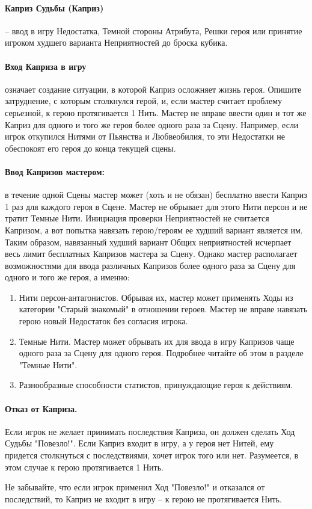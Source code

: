 \paragraph{Каприз Судьбы (Каприз)} – ввод в игру Недостатка, Темной стороны Атрибута, Решки героя или принятие игроком худшего варианта Неприятностей до броска кубика. 
\paragraph{Вход Каприза в игру} означает создание ситуации, в которой Каприз осложняет жизнь героя. Опишите затруднение, с которым столкнулся герой, и, если мастер считает проблему серьезной, к герою протягивается 1 Нить. 
\newline Мастер не вправе ввести один и тот же Каприз для одного и того же героя более одного раза за Сцену. Например, если игрок откупился Нитями от Пьянства и Любвеобилия, то эти Недостатки не обеспокоят его героя до конца текущей сцены.

\paragraph{Ввод Капризов мастером:} в течение одной Сцены мастер может (хоть и не обязан) бесплатно ввести Каприз 1 раз для каждого героя в Сцене. Мастер не обрывает для этого Нити персон и не тратит Темные Нити.
\newline Инициация проверки Неприятностей не считается Капризом, а вот попытка навязать герою/героям ее худший вариант является им. Таким образом, навязанный худший вариант Общих неприятностей исчерпает весь лимит бесплатных Капризов мастера за Сцену.
\newline Однако мастер располагает возможностями для ввода различных Капризов более одного раза за Сцену для одного и того же героя, а именно: 
\begin{enumerate}
    \item Нити персон-антагонистов. Обрывая их, мастер может применять Ходы из категории "Старый знакомый" в отношении героев. Мастер не вправе навязать герою новый Недостаток без согласия игрока.
    \item Темные Нити. Мастер может обрывать их для ввода в игру Капризов чаще одного раза за Сцену для одного героя. Подробнее читайте об этом в разделе "Темные Нити".
    \item Разнообразные способности статистов, принуждающие героя к действиям.
\end{enumerate}
\paragraph{Отказ от Каприза.} Если игрок не желает принимать последствия Каприза, он должен сделать Ход Судьбы "Повезло!". Если Каприз входит в игру, а у героя нет Нитей, ему придется столкнуться с последствиями, хочет игрок того или нет. Разумеется, в этом случае к герою протягивается 1 Нить. 
\begin{tcolorbox}
	Не забывайте, что если игрок применил Ход "Повезло!" и отказался от последствий, то Каприз не входит в игру – к герою не протягивается Нить. 
\end{tcolorbox}

